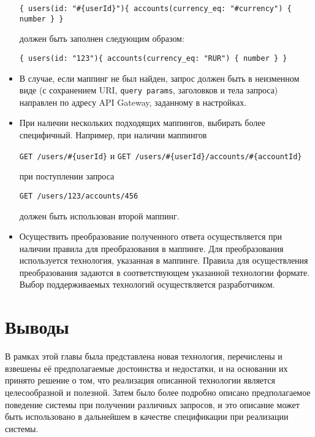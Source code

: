 \begin{itemize}
    \texttt{\{ users(id: "\#\{userId\}")\{ accounts(currency\_eq: "\#{currency}") \{ number \} \}}

    должен быть заполнен следующим образом:

    \texttt{\{ users(id: "123")\{ accounts(currency\_eq: "RUR") \{ number \} \}}

    \item В случае, если маппинг не был найден, запрос должен быть в неизменном виде (с сохранением URI, \texttt{query params}, заголовков и тела запроса) направлен по адресу API Gateway, заданному в настройках.

    \item При наличии нескольких подходящих маппингов, выбирать более специфичный.
    Например, при наличии маппингов

    \texttt{GET /users/\#\{userId\}} и \texttt{GET /users/\#\{userId\}/accounts/\#\{accountId\}}

    при поступлении запроса

    \texttt{GET /users/123/accounts/456}

    должен быть использован второй маппинг.

    \item Осуществить преобразование полученного ответа осуществляется при наличии правила для преобразования в маппинге.
    Для преобразования используется технология, указанная в маппинге.
    Правила для осуществления преобразования задаются в соответствующем указанной технологии формате.
    Выбор поддерживаемых технологий осуществляется разработчиком.
\end{itemize}


\section{Выводы} \label{sec:ch2-conclusion}

В рамках этой главы была представлена новая технология, перечислены и взвешены её предполагаемые достоинства и недостатки, и на основании их принято решение о том, что реализация описанной технологии является целесообразной и полезной.
Затем было более подробно описано предполагаемое поведение системы при получении различных запросов, и это описание может быть использовано в дальнейшем в качестве спецификации при реализации системы.
